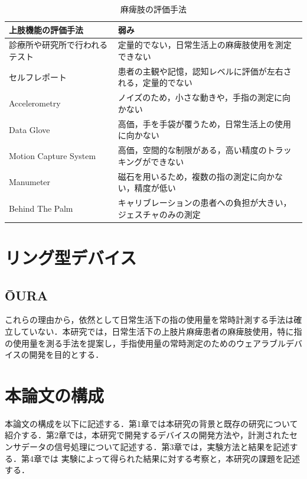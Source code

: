 \begin{table}[H]
  \caption{麻痺肢の評価手法}
  \label{table:measure}
  \centering
  \begin{tabular}{ll}
    \hline
    上肢機能の評価手法 & 弱み \\
    \hline \hline 
    診療所や研究所で行われるテスト   & 定量的でない，日常生活上の麻痺肢使用を測定できない \\
    セルフレポート & 患者の主観や記憶，認知レベルに評価が左右される，定量的でない\\
    Accelerometry   & ノイズのため，小さな動きや，手指の測定に向かない \\
    Data Glove  &  高価，手を手袋が覆うため，日常生活上の使用に向かない \\
    Motion Capture System   & 高価，空間的な制限がある，高い精度のトラッキングができない \\
    Manumeter  & 磁石を用いるため，複数の指の測定に向かない，精度が低い\\
    Behind The Palm   & キャリブレーションの患者への負担が大きい，ジェスチャのみの測定\\ 
    \hline
  \end{tabular}
\end{table}

\section{リング型デバイス}
\subsection*{ŌURA}




これらの理由から，依然として日常生活下の指の使用量を常時計測する手法は確立していない．本研究では，日常生活下の上肢片麻痺患者の麻痺肢使用，特に指の使用量を測る手法を提案し，手指使用量の常時測定のためのウェアラブルデバイスの開発を目的とする．


\section{本論文の構成}
本論文の構成を以下に記述する．第1章では本研究の背景と既存の研究について紹介する．第2章では，本研究で開発するデバイスの開発方法や，計測されたセンサデータの信号処理について記述する．第3章では，実験方法と結果を記述する．第4章では
実験によって得られた結果に対する考察と，本研究の課題を記述する．